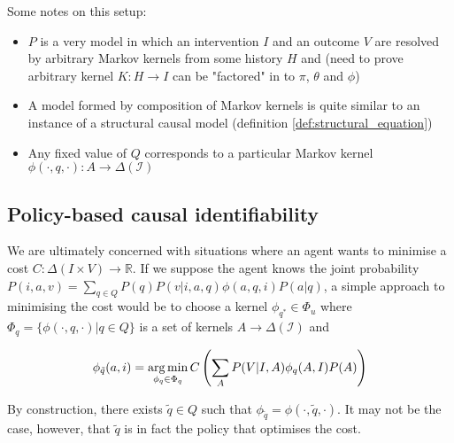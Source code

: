 \begin{center}
\end{center}

Some notes on this setup:
\begin{itemize}
    \item $P$ is a very model in which an intervention $I$ and an outcome $V$ are resolved by arbitrary Markov kernels from some history $H$ and (need to prove arbitrary kernel $K:H\to I$ can be "factored" in to $\pi$, $\theta$ and $\phi$)
    \item A model formed by composition of Markov kernels is quite similar to an instance of a structural causal model (definition \ref{def:structural_equation})
    \item Any fixed value of $Q$ corresponds to a particular Markov kernel $\phi(\cdot,q,\cdot):A\to \Delta (\mathcal{I})$
\end{itemize}

\subsection{Policy-based causal identifiability}

We are ultimately concerned with situations where an agent wants to minimise a cost $C:\Delta (I\times V)\to \mathbb{R}$. If we suppose the agent knows the joint probability $P(i,a,v) = \sum_{q\in Q} P(q) P(v|i,a,q) \phi(a,q,i) P(a|q) $, a simple approach to minimising the cost would be to choose a kernel $\phi_{q^*}\in \Phi_u$ where $\Phi_q=\{\phi(\cdot,q,\cdot)|q\in Q\}$ is a set of kernels $A\to\Delta(\mathcal{I})$ and

\begin{align}
    \phi_{\tilde{q}}(a,i) = \operatorname*{arg\,min}_{\phi_q\in \Phi_q} C \left( \sum_A P(V|I,A) \phi_q(A,I) P(A)\right)
\end{align}

By construction, there exists $\tilde{q}\in Q$ such that $\phi_{\tilde{q}}=\phi(\cdot,\tilde{q},\cdot)$. It may not be the case, however, that $\tilde{q}$ is in fact the policy that optimises the cost.

